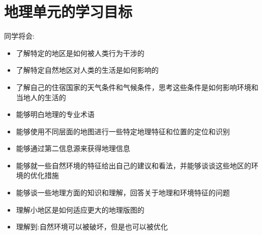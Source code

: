 \chapter{地理单元的学习目标}
    同学将会:\par

    \begin{itemize}
      \item 了解特定的地区是如何被人类行为干涉的
      \item 了解特定自然地区对人类的生活是如何影响的
      \item 了解自己的住宿国家的天气条件和气候条件，思考这些条件是如何影响环境和当地人的生活的
      \item 能够明白地理的专业术语
      \item 能够使用不同层面的地图进行一些特定地理特征和位置的定位和识别
      \item 能够通过第二信息源来获得地理信息
      \item 能够就一些自然环境的特征给出自己的建议和看法，并能够谈谈这些地区的环境的优化措施
      \item 能够谈一些地理方面的知识和理解，回答关于地理和环境特征的问题
      \item 理解小地区是如何适应更大的地理版图的
      \item 理解到:自然环境可以被破坏，但是也可以被优化
    \end{itemize}  
